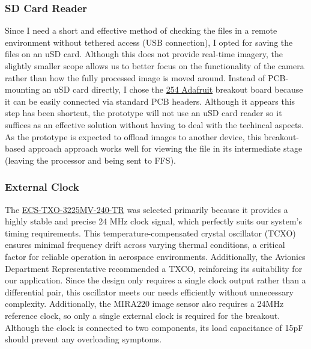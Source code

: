 \documentclass[10pt]{article}
\newcommand{\nl}{\newline \newline}
\begin{document}
\subsubsection{SD Card Reader}
Since I need a short and effective method of checking the files in a remote environment without tethered access (USB connection), I opted for saving the files on an uSD card. Although this does not provide real-time imagery, the slightly smaller scope allows us to better focus on the functionality of the camera rather than how the fully processed image is moved around.
\nl
Instead of PCB-mounting an uSD card directly, I chose the \href{https://au.mouser.com/ProductDetail/Adafruit/254?qs=GURawfaeGuAkwqCF4BmPzA%3D%3D&srsltid=AfmBOoqN0VaaHsFOYARHTvz8zYqY9TRrMM7HXF_dcSo8h28U_mns63k3}{254 Adafruit} breakout board because it can be easily connected via standard PCB headers. Although it appears this step has been shortcut, the prototype will not use an uSD card reader so it suffices as an effective solution without having to deal with the techincal aspects.
As the prototype is expected to offload images to another device, this breakout-based approach approach works well for viewing the file in its intermediate stage (leaving the processor and being sent to FFS).

\subsubsection{External Clock}\label{sec:ext-clk}
The \href{https://au.mouser.com/ProductDetail/ECS/ECS-TXO-3225MV-240-TR?qs=d0WKAl%252BL4KYXn7UuwSFJGQ%3D%3D&srsltid=AfmBOorOY2wQxS3CEel65bFe57g9eu10yFCWhAAwtVdzP2gFNVWZyZMu}{ECS-TXO-3225MV-240-TR} was selected primarily because it provides a highly stable and precise 24 MHz clock signal, which perfectly suits our system's timing requirements.
This temperature-compensated crystal oscillator (TCXO) ensures minimal frequency drift across varying thermal conditions, a critical factor for reliable operation in aerospace environments.
Additionally, the Avionics Department Representative recommended a TXCO, reinforcing its suitability for our application. Since the design only requires a single clock output rather than a differential pair, this oscillator meets our needs efficiently without unnecessary complexity.
Additionally, the MIRA220 image sensor also requires a 24MHz reference clock, so only a single external clock is required for the breakout. Although the clock is connected to two components, its load capacitance of 15pF should prevent any overloading symptoms.
\end{document}
